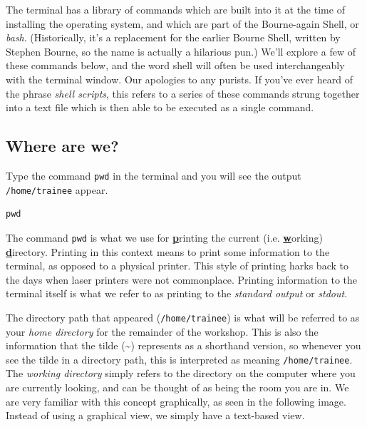 \documentclass[a4paper,12pt,twoside]{memoir}
\begin{document}
\begin{note}
The terminal has a library of commands which are built into it at the time of installing the operating system, and which are part of the Bourne-again Shell, or \textit{bash}.
(Historically, it's a replacement for the earlier Bourne Shell, written by Stephen Bourne, so the name is actually a hilarious pun.)
We'll explore a few of these commands below, and the word shell will often be used interchangeably with the terminal window.
Our apologies to any purists.
If you've ever heard of the phrase \textit{shell scripts}, this refers to a series of these commands strung together into a text file which is then able to be executed as a single command.
\end{note}

\subsection{Where are we?}
\begin{steps}
Type the command \texttt{pwd} in the terminal and you will see the output \texttt{/home/trainee} appear.
\begin{lstlisting}
pwd
\end{lstlisting}
\end{steps}

\begin{information}
The command \texttt{pwd} is what we use for \underline{\textbf{p}}rinting the current (i.e. \underline{\textbf{w}}orking) \underline{\textbf{d}}irectory.
Printing in this context means to print some information to the terminal, as opposed to a physical printer.
This style of printing harks back to the days when laser printers were not commonplace.
Printing information to the terminal itself is what we refer to as printing to the \textit{standard output} or \textit{stdout}.
\end{information}

\begin{note}
The directory path that appeared  (\texttt{/home/trainee})  is what will be referred to as your \textit{home directory} for the remainder of the workshop.
This is also the information that the tilde (\~{}) represents as a shorthand version, so whenever you see the tilde in a directory path, this is interpreted as meaning \texttt{/home/trainee}. 
The \textit{working directory} simply refers to the directory on the computer where you are currently looking, and can be thought of as being the room you are in.
We are very familiar with this concept graphically, as seen in the following image.
Instead of using a graphical view, we simply have a text-based view.\\
\end{note}
\end{document}
